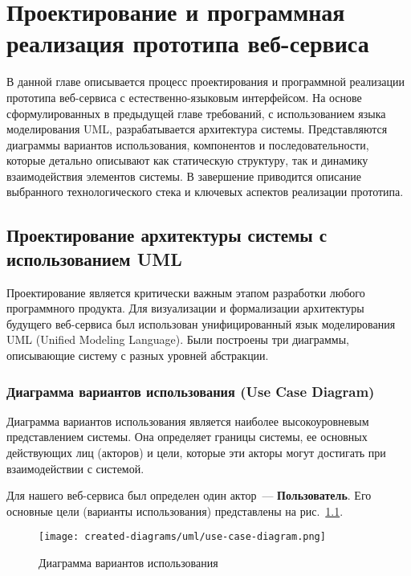 \chapter{Проектирование и программная реализация прототипа веб-сервиса}
\label{chapter3}

\begin{annotation}
      В данной главе описывается процесс проектирования и программной реализации прототипа веб-сервиса с естественно-языковым интерфейсом. На основе сформулированных в предыдущей главе требований, с использованием языка моделирования UML, разрабатывается архитектура системы. Представляются диаграммы вариантов использования, компонентов и последовательности, которые детально описывают как статическую структуру, так и динамику взаимодействия элементов системы. В завершение приводится описание выбранного технологического стека и ключевых аспектов реализации прототипа.
\end{annotation}

\section{Проектирование архитектуры системы с использованием UML}

Проектирование является критически важным этапом разработки любого программного продукта. Для визуализации и формализации архитектуры будущего веб-сервиса был использован унифицированный язык моделирования UML (Unified Modeling Language). Были построены три диаграммы, описывающие систему с разных уровней абстракции.

\subsection{Диаграмма вариантов использования (Use Case Diagram)}

Диаграмма вариантов использования является наиболее высокоуровневым представлением системы. Она определяет границы системы, ее основных действующих лиц (акторов) и цели, которые эти акторы могут достигать при взаимодействии с системой.

Для нашего веб-сервиса был определен один актор~--- \textbf{Пользователь}. Его основные цели (варианты использования) представлены на рис.~\ref{fig:use-case-diagram}.

\begin{figure}[ht]
      \centering
      \texttt{[image: created-diagrams/uml/use-case-diagram.png]}
      \caption{Диаграмма вариантов использования}
      \label{fig:use-case-diagram}
\end{figure}

